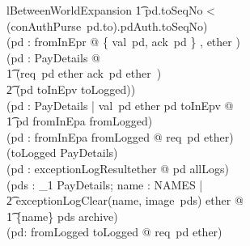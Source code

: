 \begin{LNewLemma}
\begin{theorem}{lBetweenWorldExpansion}
        \t1 pd.toSeqNo < (conAuthPurse~pd.to).pdAuth.toSeqNo) \\
    \land %
    (\forall pd : fromInEpr @ \disjoint \langle \{ val~pd, ack~pd \} , ether \rangle) \\
    \land %
    (\forall pd : PayDetails @ \\ %
        \t1 (req~pd \in ether \land ack~pd \notin ether~) \\ %
        \t2 \iff (pd \in toInEpv \cup toLogged)) \\
    \land %
    (\forall pd : PayDetails | val~pd \in ether \land pd \in toInEpv @ \\ %
        \t1 pd \in fromInEpa \cup fromLogged) \\
    \land %
    (\forall pd : fromInEpa \cup fromLogged @  req~pd \in ether) \\
    \land %
    (toLogged \in \finset PayDetails) \\
    \land %
    (\forall pd : exceptionLogResult\inv \limg ether \rimg @ pd \in allLogs) \\
    \land %
    (\forall pds : \power_1 PayDetails; name : NAMES | \\ %
            \t2 exceptionLogClear(name, image~pds) \in ether @ \\ %
        \t1 \{name\} \cross pds \subseteq archive) \\
    \land %
    (\forall pd: fromLogged \cup toLogged @ req~pd \in ether)
\end{theorem}~\end{LNewLemma}


